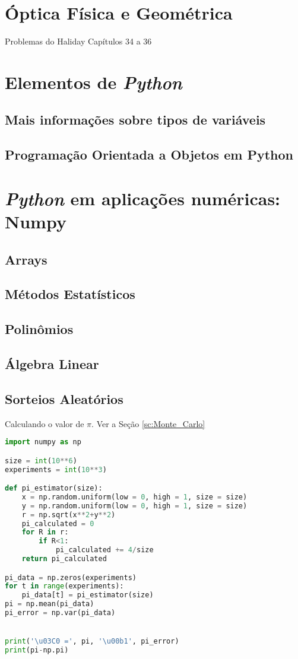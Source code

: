 \documentclass[12pt,a4paper,titlepage,portuges,twoside,final]{book}
\begin{document}


\chapter{Óptica Física e Geométrica}
Problemas do Haliday Capítulos 34 a 36




\appendix
\chapter{Elementos de {\it Python}}\label{a:numpy}
\section{Mais informações sobre tipos de variáveis}\label{ap:1.1}
\section{Programação Orientada a Objetos em Python}\label{ap:1.2}

\chapter{{\it Python} em aplicações numéricas: Numpy}
\section{Arrays}
\section{Métodos Estatísticos}
\section{Polinômios}
\section{Álgebra Linear}
\section{Sorteios Aleatórios}

Calculando o valor de $\pi$. Ver a Seção \ref{sc:Monte_Carlo}
\begin{lstlisting}[language=Python, frame=lines,basicstyle=\footnotesize, caption={Estimando o valor de $\pi$ usando sorteios aleatórios}, label={lst:x+y}]
import numpy as np

size = int(10**6)
experiments = int(10**3)

def pi_estimator(size):
    x = np.random.uniform(low = 0, high = 1, size = size)
    y = np.random.uniform(low = 0, high = 1, size = size)
    r = np.sqrt(x**2+y**2)
    pi_calculated = 0
    for R in r:
        if R<1:
            pi_calculated += 4/size
    return pi_calculated

pi_data = np.zeros(experiments)
for t in range(experiments):
    pi_data[t] = pi_estimator(size)
pi = np.mean(pi_data)
pi_error = np.var(pi_data)


print('\u03C0 =', pi, '\u00b1', pi_error)
print(pi-np.pi)
\end{lstlisting}
\end{document}
